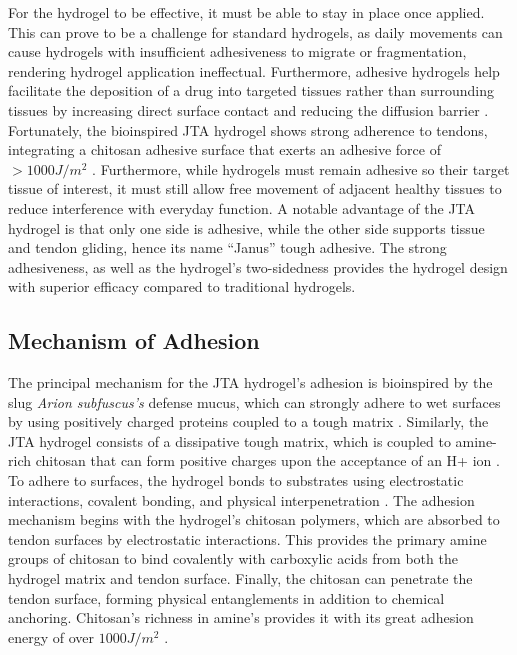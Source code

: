 For the hydrogel to be effective, it must be able to stay in place once applied. This can prove to be a challenge for standard hydrogels, as daily movements can cause hydrogels with insufficient adhesiveness to migrate or fragmentation, rendering hydrogel application ineffectual. Furthermore, adhesive hydrogels help facilitate the deposition of a drug into targeted tissues rather than surrounding tissues by increasing direct surface contact and reducing the diffusion barrier \autocite{freedmanEnhancedTendonHealing2022}. Fortunately, the bioinspired JTA hydrogel shows strong adherence to tendons, integrating a chitosan adhesive surface that exerts an adhesive force of $>1000J/m^2$ \autocite{freedmanEnhancedTendonHealing2022}. Furthermore, while hydrogels must remain adhesive so their target tissue of interest, it must still allow free movement of adjacent healthy tissues to reduce interference with everyday function. A notable advantage of the JTA hydrogel is that only one side is adhesive, while the other side supports tissue and tendon gliding, hence its name “Janus” tough adhesive. The strong adhesiveness, as well as the hydrogel’s two-sidedness provides the hydrogel design with superior efficacy compared to traditional hydrogels.

\subsection{Mechanism of Adhesion}
The principal mechanism for the JTA hydrogel’s adhesion is bioinspired by the slug \textit{Arion subfuscus’s} defense mucus, which can strongly adhere to wet surfaces by using positively charged proteins coupled to a tough matrix \autocite{li_tough_2017}. Similarly, the JTA hydrogel consists of a dissipative tough matrix, which is coupled to amine-rich chitosan that can form positive charges upon the acceptance of an H+ ion \autocite{freedmanEnhancedTendonHealing2022}. 
To adhere to surfaces, the hydrogel bonds to substrates using electrostatic interactions, covalent bonding, and physical interpenetration \autocite{li_tough_2017}. The adhesion mechanism begins with the hydrogel’s chitosan polymers, which are absorbed to tendon surfaces by electrostatic interactions. This provides the primary amine groups of chitosan to bind covalently with carboxylic acids from both the hydrogel matrix and tendon surface. Finally, the chitosan can penetrate the tendon surface, forming physical entanglements in addition to chemical anchoring. Chitosan’s richness in amine’s provides it with its great adhesion energy of over $1000J/m^2$ \autocite{li_tough_2017}.

